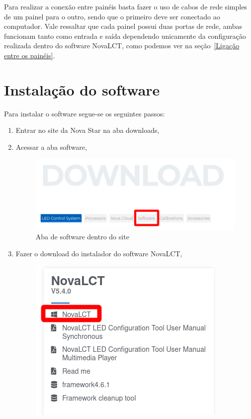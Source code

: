 \documentclass[12pt, a4paper]{article}
\begin{document}
Para realizar a conexão entre painéis basta fazer o uso de cabos de rede simples de um painel para o outro, sendo que o primeiro deve ser conectado ao computador. Vale ressaltar que cada painel possui duas portas de rede, ambas funcionam tanto como entrada e saída dependendo unicamente da configuração realizada dentro do software NovaLCT, como podemos ver na seção~\ref{Ligação entre os painéis}.

\newpage
\section{Instalação do software}\label{Instalação do software}
Para instalar o software segue-se os seguintes passos:
\begin{enumerate}
	\item Entrar no site da Nova Star na aba downloads\cite{siteDownload},
	\item Acessar a aba software,
		\begin{figure}[!htb]
			\centering
			\includegraphics[width=\textwidth]{Download.png}
			\caption{\label{fig:Download}Aba de software dentro do site\cite{siteDownload}}
		\end{figure}
	\item Fazer o download do instalador do software NovaLCT,
		\begin{figure}[!htb]
			\centering
			\includegraphics[scale=.9]{NOVALCT_INSTALL.png}

\end{figure}
\end{enumerate}
\end{document}
